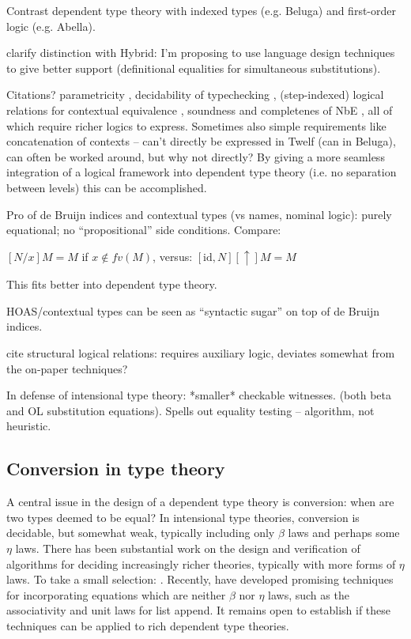 \documentclass{article}
\newcommand{\LONGVERSION}[1]{{\color{light-gray}#1}}
\begin{document}
\LONGVERSION{
Contrast dependent type theory with indexed types (e.g. Beluga) and first-order
logic (e.g. Abella). 

clarify distinction with Hybrid: I'm proposing to use language design
techniques to give better support (definitional equalities for
simultaneous substitutions).

Citations? parametricity \citep{Reynolds,morerecent?}, decidability of
  typechecking \citep{Coquand?}, (step-indexed) logical relations for contextual
  equivalence \citep{Dreyer11,others}, soundness and completenes of
  NbE \citep{Dybjer00,Abel07}, all of which require
  richer logics to express. Sometimes also simple requirements like
  concatenation of contexts -- can't directly be expressed in Twelf
  (can in Beluga), can often be worked around, but why not directly? 
  By giving a more seamless integration of a logical framework
  into dependent type theory (i.e. no separation between levels) this
  can be accomplished.

Pro of de Bruijn indices and contextual types (vs names, nominal
logic): purely equational; no ``propositional'' side
conditions. Compare:

$[N/x]M = M$ if $x \not\in fv(M)$, versus: $[\text{id},N][\uparrow]M = M$

This fits better into dependent type theory.

HOAS/contextual types can be seen as ``syntactic sugar'' on top of de Bruijn indices.

cite structural logical relations: requires auxiliary logic, deviates
somewhat from the on-paper techniques? \citep{Schurmann08}

In defense of intensional type theory: *smaller* checkable
witnesses. (both beta and OL substitution equations). Spells out
equality testing -- algorithm, not heuristic. 
}

\subsection{Conversion in type theory}
A central issue in the design of a dependent type theory is
conversion: when are two types deemed to be equal? In
intensional type theories, conversion is decidable, but somewhat
weak, typically including only $\beta$ laws and perhaps some $\eta$
laws. There has been substantial work on the design and verification
of algorithms for deciding increasingly richer theories, typically
with more forms of $\eta$ laws. To take a
small selection: \cite{Coquand91,Harper05,Abel11}. Recently,
\cite{Allais13} have developed promising techniques for incorporating equations
which are neither $\beta$ nor $\eta$ laws, such as the associativity
and unit laws for list append. It remains open to establish if 
these techniques can be applied to rich dependent type theories.
\end{document}
